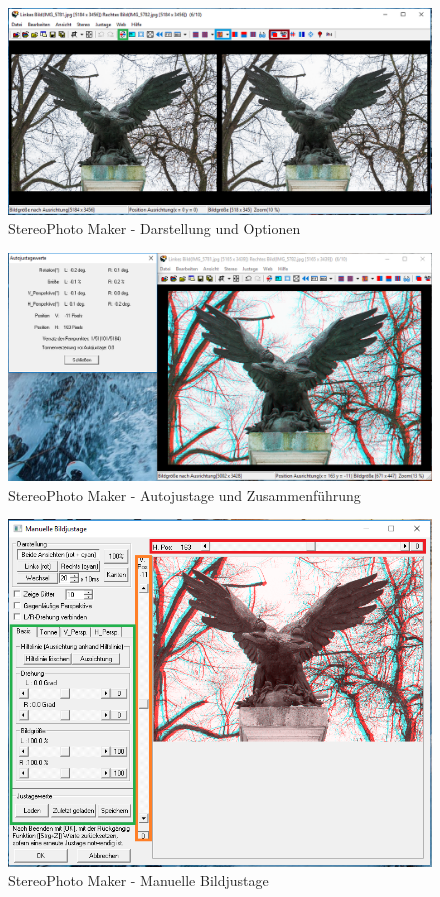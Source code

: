 \documentclass[liststotoc,bibtotoc,fontsize=14pt,]{scrreprt}
\begin{document}
		\begin{figure}[H]
			\includegraphics[width=\linewidth]{img/steps/step2.png}
			\caption{StereoPhoto Maker - Darstellung und Optionen}
			\label{img:maker_options}
		\end{figure}
		
		\begin{figure}[H]
			\includegraphics[width=\linewidth]{img/steps/step3.png}
			\caption{StereoPhoto Maker - Autojustage und Zusammenführung}
			\label{img:maker_justage}
		\end{figure}
		
		\begin{figure}[H]
			\includegraphics[width=\linewidth]{img/steps/step4.png}
			\caption{StereoPhoto Maker - Manuelle Bildjustage}
			\label{img:maker_manual}
		\end{figure}

	
\end{document}
